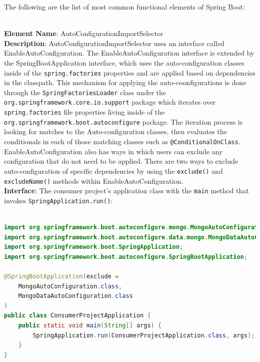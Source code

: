 The following are the list of most common functional elements of Spring Boot:
{
\obeylines
\setlength\parindent{0pt}

\noindent\makebox[\linewidth]{\rule{\textwidth}{3pt}}\ \\

\textbf{Element Name}: AutoConfigurationImportSelector\\
\textbf{Description}: AutoConfigurationImportSelector uses an interface called EnableAutoConfiguration. The EnableAutoConfiguration interface is extended by the SpringBootApplication interface, which uses the auto-configuration classes inside of the \texttt{spring.factories} properties and are applied based on dependencies in the classpath. This mechanism for applying the auto-coonfigurations is done through the \texttt{SpringFactoriesLoader} class under the \texttt{org.springframework.core.io.support} package which iterates over \texttt{spring.factories} file properties living inside of the \texttt{org.springframework.boot.autoconfigure} package. The iteration process is looking for matches to the Auto-configuration classes, then evaluates the conditionals in each of those matching classes such as \texttt{@ConditionalOnClass}. EnableAutoConfiguration also has ways in which users can exclude any configuration that do not need to be applied. There are two ways to exclude auto-configuration of specific dependencies by using the \texttt{exclude()} and \texttt{excludeName()} methods within EnableAutoConfiguration.\\
\textbf{Interface}: The consumer project's application class with the \texttt{main} method that invokes \texttt{SpringApplication.run()}:\\

\begin{lstlisting}[language=Java, caption=Consumer Project Auto-Configuring Dependencies using SpringBootApplication]

import org.springframework.boot.autoconfigure.mongo.MongoAutoConfiguration;
import org.springframework.boot.autoconfigure.data.mongo.MongoDataAutoConfiguration;
import org.springframework.boot.SpringApplication;
import org.springframework.boot.autoconfigure.SpringBootApplication;

@SpringBootApplication(exclude =
	MongoAutoConfiguration.class,
    MongoDataAutoConfiguration.class
)
public class ConsumerProjectApplication {
	public static void main(String[] args) {
        SpringApplication.run(ConsumerProjectApplication.class, args);
    }
}
\end{lstlisting}\ \\

}
